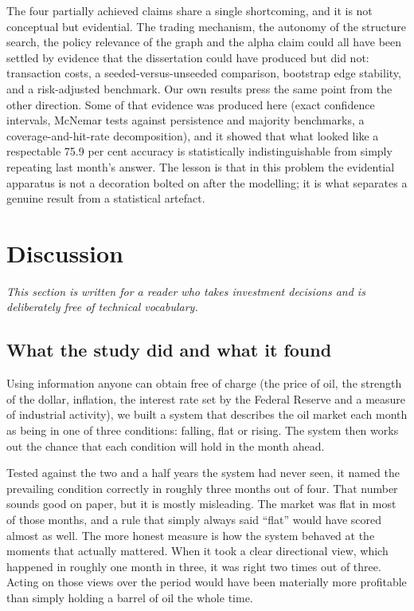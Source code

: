 \documentclass[11pt,a4paper]{article}
\begin{document}
The four partially achieved claims share a single shortcoming, and it is not conceptual but
evidential. The trading mechanism, the autonomy of the structure search, the policy relevance of
the graph and the alpha claim could all have been settled by evidence that the dissertation could
have produced but did not: transaction costs, a seeded-versus-unseeded comparison, bootstrap edge
stability, and a risk-adjusted benchmark. Our own results press the same point from the other
direction. Some of that evidence was produced here (exact confidence intervals, McNemar tests
against persistence and majority benchmarks, a coverage-and-hit-rate decomposition), and it
showed that what looked like a respectable 75.9 per cent accuracy is statistically
indistinguishable from simply repeating last month's answer. The lesson is that in this problem
the evidential apparatus is not a decoration bolted on after the modelling; it is what separates a
genuine result from a statistical artefact.

\section{Discussion}

\textit{This section is written for a reader who takes investment decisions and is deliberately
free of technical vocabulary.}

\subsection{What the study did and what it found}

Using information anyone can obtain free of charge (the price of oil, the strength of the dollar,
inflation, the interest rate set by the Federal Reserve and a measure of industrial activity),
we built a system that describes the oil market each month as being in one of three conditions:
falling, flat or rising. The system then works out the chance that each condition will hold in
the month ahead.

Tested against the two and a half years the system had never seen, it named the prevailing
condition correctly in roughly three months out of four. That number sounds good on paper, but it is
mostly misleading. The market was flat in most of those months, and a rule that simply always
said ``flat'' would have scored almost as well. The more honest measure is how the system behaved
at the moments that actually mattered. When it took a clear directional view, which happened in
roughly one month in three, it was right two times out of three. Acting on those views over
the period would have been materially more profitable than simply holding a barrel of oil the whole
time.
\end{document}

